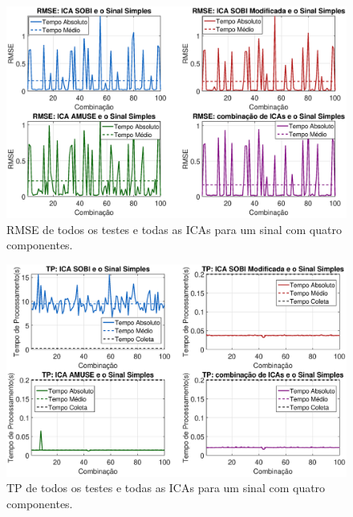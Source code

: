 \documentclass[a4paper,12pt]{monografia}
\theoremstyle{plain}
\theoremstyle{definition}
\theoremstyle{remark}
\begin{document}
\begin{figure}[!htb]
    \begin{center}
    \advance\leftskip -1.5cm
    \includegraphics[scale=0.45]{imagens/ImagensParaOAnexo/RMSEETodasICAsSinalSimples.eps}
    \caption{RMSE de todos os testes e todas as ICAs para um sinal com quatro componentes.}
    \label{fig:RMSESinalsimples}    
    \end{center}
\end{figure}

\begin{figure}[!htb]
    \begin{center}
    \advance\leftskip -1.5cm
    \includegraphics[scale=0.45]{imagens/ImagensParaOAnexo/TPAETodasICAsSinalSimples.eps}
    \caption{TP de todos os testes e todas as ICAs para um sinal com quatro componentes.}
    \label{fig:TPSinalsimples}    
    \end{center}
\end{figure}
\end{document}
